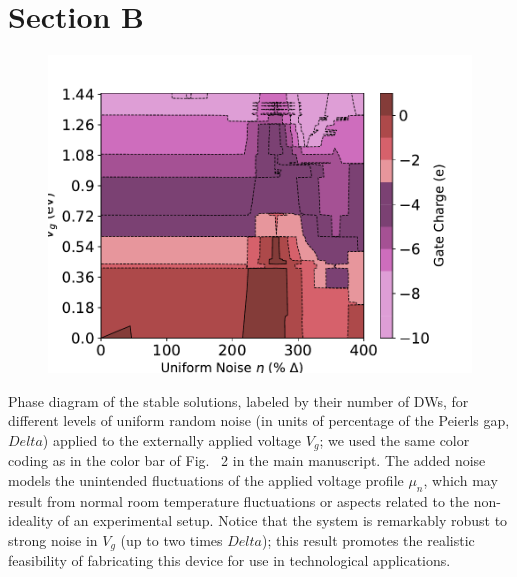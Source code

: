 \documentclass[aps, prd, reprint]{revtex4-2}
\begin{document}
\section*{Section B}
%
\begin{figure}[h!]
    \includegraphics[scale=0.7]{figures/noise_contourmap.pdf}
    \label{fig:noise}
\end{figure}
%
Phase diagram of the stable solutions, labeled by their number of DWs, for different levels of uniform random noise (in units of percentage of the Peierls gap, $Delta$) applied to the externally applied voltage $V_{g}$; we used the same color coding as in the color bar of Fig. ~2 in the main manuscript. The added noise models the unintended fluctuations of the applied voltage profile $\mu_{n}$, which may result from normal room temperature fluctuations or aspects related to the non-ideality of an experimental setup. Notice that the system is remarkably robust to strong noise in $V_{g}$ (up to two times $Delta$); this result promotes the realistic feasibility of fabricating this device for use in technological applications.
\end{document}
